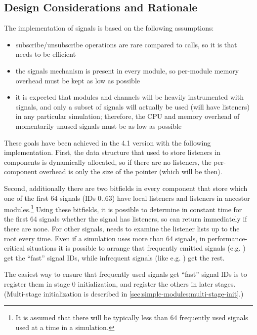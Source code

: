 \subsection{Design Considerations and Rationale}

The implementation of signals is based on the following assumptions:

\begin{itemize}
  \item subscribe/unsubscribe operations are rare compared to 
    calls, so it is  that needs to be efficient
  \item the signals mechanism is present in every module, so per-module
    memory overhead must be kept as low as possible
  \item it is expected that modules and channels will be heavily instrumented
    with signals, and only a subset of signals will actually be used
    (will have listeners) in any particular simulation; therefore,
    the CPU and memory overhead of momentarily unused signals must be
    as low as possible
\end{itemize}

These goals have been achieved in the 4.1 version with the following
implementation. First, the data structure that used to store listeners in
components is dynamically allocated, so if there are no listeners, the
per-component overhead is only the size of the pointer (which will be
 then).

Second, additionally there are two bitfields in every component that store
which one of the first 64 signals (IDs 0..63) have local listeners and
listeners in ancestor modules.\footnote{It is assumed that there will be
typically less than 64 frequently used signals used at a time in a
simulation.} Using these bitfields, it is possible to determine in constant
time for the first 64 signals whether the signal has listeners, so
 can return immediately if there are none. For other signals,
 needs to examine the listener lists up to the root every
time. Even if a simulation uses more than 64 signals, in
performance-critical situations it is possible to arrange that frequently
emitted signals (e.g. ) get the ``fast'' signal IDs, while
infrequent signals (like e.g. ) get the rest.

The easiest way to ensure that frequently used signals get ``fast'' signal IDs
is to register them in stage 0 initialization, and register the others
in later stages. (Multi-stage initialization is described in
\ref{sec:simple-modules:multi-stage-init}.)


